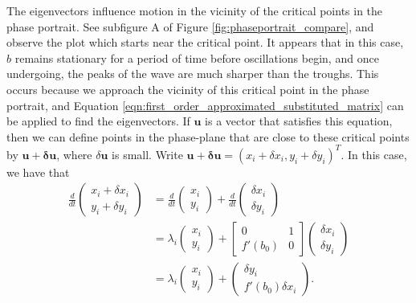 \documentclass{article}
\begin{document}
The eigenvectors influence motion in the vicinity of the critical points in the phase portrait.
See subfigure A of Figure \ref{fig:phaseportrait_compare}, and observe the plot which starts near the critical point.
It appears that in this case, $b$ remains stationary for a period of time before oscillations begin,
and once undergoing, the peaks of the wave are much sharper than the troughs.
This occurs because we approach the vicinity of this critical point in the phase portrait,
and Equation \ref{eqn:first_order_approximated_substituted_matrix} can be applied to find the eigenvectors.
If $\mathbf{u}$ is a vector that satisfies this equation,
then we can define points in the phase-plane that are close to these critical points by $\mathbf{u} + \mathbf{\delta u}$,
where $\delta\mathbf{u}$ is small.
Write $\mathbf{u + \delta u} = (x_i + \delta x_i, y_i + \delta y_i)^T$.
In this case, we have that
\begin{equation}
\begin{aligned}
    \frac{d}{dt} \begin{pmatrix}
        x_i + \delta x_i\\
        y_i + \delta y_i
    \end{pmatrix} &= \frac{d}{dt}\begin{pmatrix}
        x_i \\
        y_i
    \end{pmatrix} + \frac{d}{dt}\begin{pmatrix}
        \delta x_i \\
        \delta y_i
    \end{pmatrix} \\
    &= \lambda_i \begin{pmatrix}
        x_i \\
        y_i
    \end{pmatrix} + \begin{bmatrix}
        0 & 1 \\
        f'(b_0) & 0
    \end{bmatrix} \begin{pmatrix} %
        \delta x_i \\
        \delta y_i
    \end{pmatrix} \\
    &= \lambda_i \begin{pmatrix}
        x_i \\
        y_i
    \end{pmatrix} + \begin{pmatrix}
        \delta y_i \\
        f'(b_0) \delta x_i
    \end{pmatrix}.
    \label{eqn:matrix_eigenvectors_vicinity} %
\end{aligned}
\end{equation}
\end{document}
